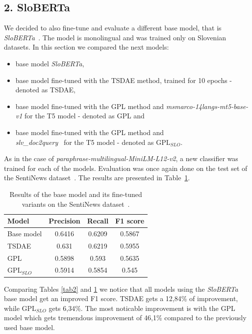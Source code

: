 \documentclass[fleqn,moreauthors,10pt]{ds_report}
\begin{document}
\subsection*{\large{2. SloBERTa}}
We decided to also fine-tune and evaluate a different base model, that is {\it SloBERTa}~\cite{sloberta}. The model is monolingual and was trained only on Slovenian datasets. In this section we compared the next models:
\begin{itemize}
	\item base model {\it SloBERTa},
	\item base model fine-tuned with the TSDAE method, trained for 10 epochs - denoted as TSDAE,
	\item base model fine-tuned with the GPL method and {\it msmarco-14langs-mt5-base-v1} \cite{msmarco14langs} for the T5 model - denoted as GPL and
	\item base model fine-tuned with the GPL method and \\{\it slv\_doc2query}~\cite{boshko} for the T5 model - denoted as $\text{GPL}_{SLO}$.
\end{itemize}

As in the case of {\it paraphrase-multilingual-MiniLM-L12-v2}, a new classifier was trained for each of the models. Evaluation was once again done on the test set of the SentiNews dataset~\cite{sentiNews}. The results are presented in Table~\ref{tab4}.

\begin{table}[!h]
	\footnotesize
	\begin{center}
		\begin{tabular}{ |l|c|c|c| }
		\hline
		\rowcolor{Blue}Model & Precision & Recall & F1 score\\
		\hline

		Base model & 0.6416 & 0.6209 & 0.5867\\
		\hline
		TSDAE & 0.631 & 0.6219 & 0.5955\\
		\hline
		GPL & 0.5898 & 0.593 & 0.5635\\
		$\text{GPL}_{SLO}$ & 0.5914 & 0.5854 & 0.545\\

		\hline
		\end{tabular}
	\end{center}
\caption{Results of the base model and its fine-tuned variants on the SentiNews dataset~\cite{sentiNews}.}
\label{tab4}
\end{table}

Comparing Tables \ref*{tab2} and \ref*{tab4} we notice that all models using the {\it SloBERTa} base model get an
improved F1 score. TSDAE gets a 12,84\% of improvement, while $\text{GPL}_{SLO}$ gets 6,34\%.
The most noticable improvement is with the GPL model which gets tremendous improvement of 46,1\% compared to the previously used
base model.
\end{document}

